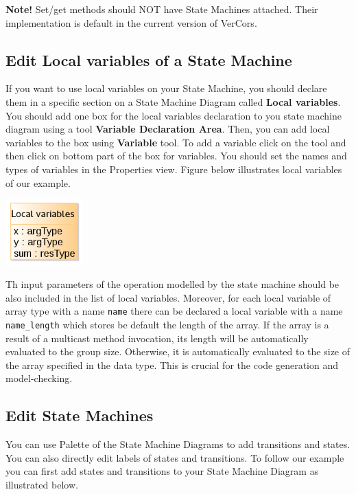 \documentclass[12pt]{article}
\begin{document}
\textbf{Note! }Set/get methods should NOT have State Machines attached. Their implementation is default in the current version of VerCors.

\subsection{Edit Local variables of a State Machine }
If you want to use local variables on your State Machine, you should declare them in a specific section on a State Machine Diagram called \textbf{Local variables}. You should add one box for the local variables declaration to you state machine diagram using a tool \textbf{Variable Declaration Area}. Then, you can add local variables to the box using \textbf{Variable} tool. To add a variable click on the tool and then click on bottom part of the box for variables. You should set the names and types of variables in the Properties view. Figure below illustrates local variables of our example.

     \centerline{
     \includegraphics[width=3cm]{draws/loc-var.png}
     \label{fig:vce-proj}
     }
 
 Th input parameters of the operation modelled by the state machine should be also included in the list of local variables. Moreover, for each local variable of array type with a name \texttt{name} there can be declared a local variable with a name \texttt{name\_length} which stores be default the length of the array. If the array is a result of a multicast method invocation, its length will be automatically evaluated to the group size. Otherwise, it is automatically evaluated to the size of the array specified in the data type. This is crucial for the code generation and model-checking.
 
\subsection{Edit State Machines}
\label{sm}
You can use Palette of the State Machine Diagrams to add transitions and states. You can also directly edit labels of states and transitions. To follow our example you can first add states and transitions to your State Machine Diagram as illustrated below.
\end{document}
